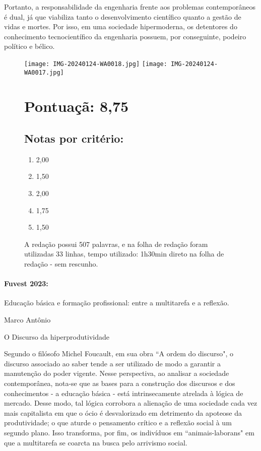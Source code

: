 \documentclass{article}
\begin{document}
Portanto, a responsabilidade da engenharia frente aos problemas contemporâneos é dual, já que viabiliza tanto o desenvolvimento científico quanto a gestão de vidas e mortes. Por isso, em uma sociedade hipermoderna, os detentores do conhecimento tecnocientífico da engenharia possuem, por conseguinte, podeiro político e bélico.


\begin{figure}
\centering
\texttt{[image: IMG-20240124-WA0018.jpg]}
\texttt{[image: IMG-20240124-WA0017.jpg]}
\caption{\label{}A redação possui 507 palavras, e na folha de redação foram utilizadas 33 linhas, tempo utilizado: 1h30min direto na folha de redação - sem rescunho. }
\section*{Pontuaçã: 8,75}

\subsection*{Notas por critério:}
\begin{enumerate}
 \item 2,00 \item 1,50  \item 2,00 \item 1,75 \item 1,50

\end{enumerate}
\end{figure}

\newpage 
\paragraph{ Fuvest 2023:}Educação básica e formação profissional: entre a multitarefa e a reflexão.

\begin{flushright} Marco Antônio \end{flushright}

O Discurso da hiperprodutividade

Segundo o filósofo Michel Foucault, em sua obra “A ordem do discurso", o discurso associado ao saber tende a ser utilizado de modo a garantir a manutenção do poder vigente. Nesse perspectiva, ao analisar a sociedade contemporânea, nota-se que as bases para a construção dos discursos e dos conhecimentos - a educação básica - está intrinsecamente atrelada à lógica de mercado. Desse modo, tal lógica corrobora a alienação de uma sociedade cada vez mais capitalista em que o ócio é desvalorizado em detrimento da apoteose da produtividade; o que aturde o pensamento crítico e a reflexão social à um segundo plano. Isso transforma, por fim, os indivíduos em “animais-laborans" em que a multitarefa se coarcta na busca pelo arrivismo social.
\end{document}
